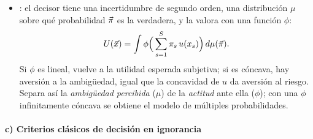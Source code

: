 \documentclass[11pt]{article}
\begin{document}
\begin{itemize}
\item {}\nocite{KlibanoffMarinacciMukerji2005Smooth}: el decisor tiene una incertidumbre de segundo orden, una distribución $\mu$ sobre qué probabilidad $\vec{\pi}$ es la verdadera, y la valora con una función $\phi$:
  $$U(\vec{x})=\int\phi\Big(\sum_{s=1}^{S}\pi_s\,u(x_s)\Big)\,d\mu(\vec{\pi}).$$
  Si $\phi$ es lineal, vuelve a la utilidad esperada subjetiva; si es cóncava, hay aversión a la ambigüedad, igual que la concavidad de $u$ da aversión al riesgo. Separa así la \emph{ambigüedad percibida} ($\mu$) de la \emph{actitud} ante ella ($\phi$); con una $\phi$ infinitamente cóncava se obtiene el modelo de múltiples probabilidades.
\end{itemize}

\paragraph{c) Criterios clásicos de decisión en ignorancia}
\end{document}
